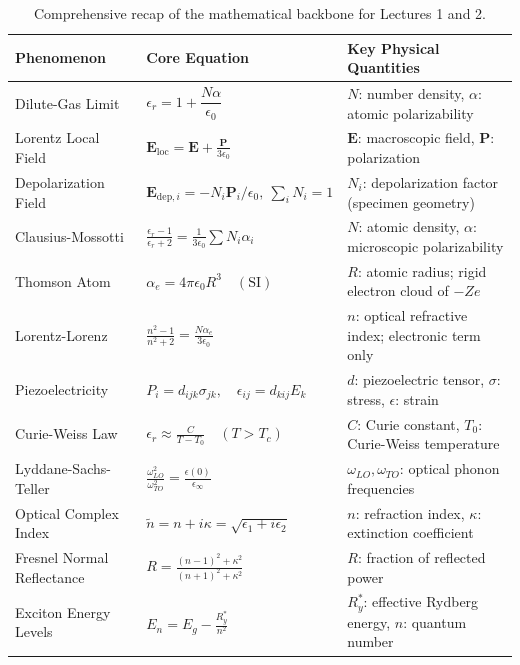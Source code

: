 \documentclass[11pt,a4paper]{article}
\begin{document}
\begin{table}[htbp]
\centering
\small
\begin{tabularx}{\textwidth}{@{}l >{\raggedright\arraybackslash}X >{\raggedright\arraybackslash}X@{}}
\toprule
\textbf{Phenomenon} & \textbf{Core Equation} & \textbf{Key Physical Quantities} \\
\midrule
Dilute-Gas Limit & $\epsilon_r = 1 + \dfrac{N\alpha}{\epsilon_0}$ & $N$: number density, $\alpha$: atomic polarizability \\
Lorentz Local Field & $\mathbf{E}_{\text{loc}} = \mathbf{E} + \frac{\mathbf{P}}{3\epsilon_0}$ & $\mathbf{E}$: macroscopic field, $\mathbf{P}$: polarization \\
Depolarization Field & $\mathbf{E}_{\text{dep},i} = -N_i\mathbf{P}_i/\epsilon_0,\ \sum_i N_i = 1$ & $N_i$: depolarization factor (specimen geometry) \\
Clausius-Mossotti & $\frac{\epsilon_r - 1}{\epsilon_r + 2} = \frac{1}{3\epsilon_0}\sum N_i \alpha_i$ & $N$: atomic density, $\alpha$: microscopic polarizability \\
Thomson Atom & $\alpha_e = 4\pi\epsilon_0 R^3 \quad (\mathrm{SI})$ & $R$: atomic radius; rigid electron cloud of $-Ze$ \\
Lorentz-Lorenz & $\frac{n^2 - 1}{n^2 + 2} = \frac{N\alpha_e}{3\epsilon_0}$ & $n$: optical refractive index; electronic term only \\
Piezoelectricity & $P_i = d_{ijk}\sigma_{jk}, \quad \epsilon_{ij} = d_{kij}E_k$ & $d$: piezoelectric tensor, $\sigma$: stress, $\epsilon$: strain \\
Curie-Weiss Law & $\epsilon_r \approx \frac{C}{T - T_0} \quad (T > T_c)$ & $C$: Curie constant, $T_0$: Curie-Weiss temperature \\
Lyddane-Sachs-Teller & $\frac{\omega_{LO}^2}{\omega_{TO}^2} = \frac{\epsilon(0)}{\epsilon_\infty}$ & $\omega_{LO}, \omega_{TO}$: optical phonon frequencies \\
Optical Complex Index & $\tilde{n} = n + i\kappa = \sqrt{\epsilon_1 + i\epsilon_2}$ & $n$: refraction index, $\kappa$: extinction coefficient \\
Fresnel Normal Reflectance & $R = \frac{(n-1)^2 + \kappa^2}{(n+1)^2 + \kappa^2}$ & $R$: fraction of reflected power \\
Exciton Energy Levels & $E_n = E_g - \frac{R_y^*}{n^2}$ & $R_y^*$: effective Rydberg energy, $n$: quantum number \\
\bottomrule
\end{tabularx}
\caption{Comprehensive recap of the mathematical backbone for Lectures 1 and 2.}
\label{tab:recap}
\end{table}
\end{document}
